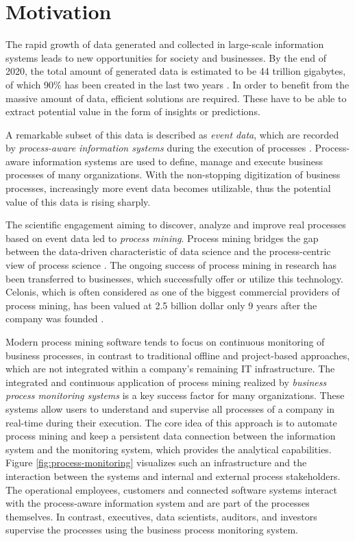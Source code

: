 
\section{Motivation}

The rapid growth of data generated and collected in large-scale information systems leads to new opportunities for  society and businesses. 
By the end of 2020, the total amount of generated data is estimated to be 44 trillion gigabytes, of which 90\% has been created in the last two years \cite{datagrowth}.
In order to benefit from the massive amount of data, efficient solutions are required.
These have to be able to extract potential value in the form of insights or predictions.

A remarkable subset of this data is described as \textit{event data}, which are recorded by \textit{process-aware information systems} during the execution of processes \cite{DBLP:journals/topnoc/Aalst09}.
Process-aware information systems are used to define, manage and execute business processes of many organizations.
With the non-stopping digitization of business processes, increasingly more event data becomes utilizable, thus the potential value of this data is rising sharply.

The scientific engagement aiming to discover, analyze and improve real processes based on event data led to \textit{process mining}. Process mining bridges the gap between the data-driven characteristic of data science and the process-centric view of process science  \cite{DBLP:books/sp/Aalst16}.
The ongoing success of process mining in research has been transferred to businesses, which successfully offer or utilize this technology.
Celonis, which is often considered as one of the biggest commercial providers of process mining, has been valued at 2.5 billion dollar only 9 years after the company was founded \cite{celonis}.

Modern process mining software tends to focus on continuous monitoring of business processes, in contrast to traditional offline and project-based approaches, which are not integrated within a company’s remaining IT infrastructure.
The integrated and continuous application of process mining realized by \textit{business process monitoring systems} is a key success factor for many organizations.
These systems allow users to understand and supervise all processes of a company in real-time during their execution.
The core idea of this approach is to automate process mining and keep a persistent data connection between the information system and the monitoring system, which provides the analytical capabilities.
Figure \ref{fig:process-monitoring} visualizes such an infrastructure and the interaction between the systems and internal and external process stakeholders.
The operational employees, customers and connected software systems interact with the process-aware information system and are part of the processes themselves.
In contrast, executives, data scientists, auditors, and investors supervise the processes using the business process monitoring system.

